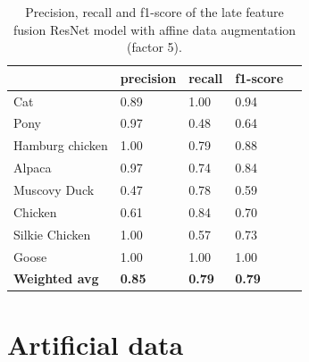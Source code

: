 \documentclass{l4proj}
\begin{document}
\begin{appendices}
\begin{table}[H]
  \centering
  \begin{tabular}{@{}lllll@{}}
  \toprule
                        & \textbf{precision} & \textbf{recall} & \textbf{f1-score} &  \\ \midrule
  Cat                   & 0.89               & 1.00            & 0.94              &  \\
  Pony                  & 0.97               & 0.48            & 0.64              &  \\
  Hamburg chicken       & 1.00               & 0.79            & 0.88              &  \\
  Alpaca                & 0.97               & 0.74            & 0.84              &  \\
  Muscovy Duck          & 0.47               & 0.78            & 0.59              &  \\
  Chicken               & 0.61               & 0.84            & 0.70              &  \\
  Silkie Chicken        & 1.00               & 0.57            & 0.73              &  \\
  Goose                 & 1.00               & 1.00            & 1.00              &  \\
  \midrule
  \textbf{Weighted avg} & \textbf{0.85}      & \textbf{0.79}   & \textbf{0.79}     &  \\ \bottomrule
  \end{tabular}
  \caption{Precision, recall and f1-score of the late feature fusion ResNet model with affine data augmentation (factor 5).}
  \label{table:appendix_affine_3}
\end{table}


\section{Artificial data}


\end{appendices}
\end{document}
